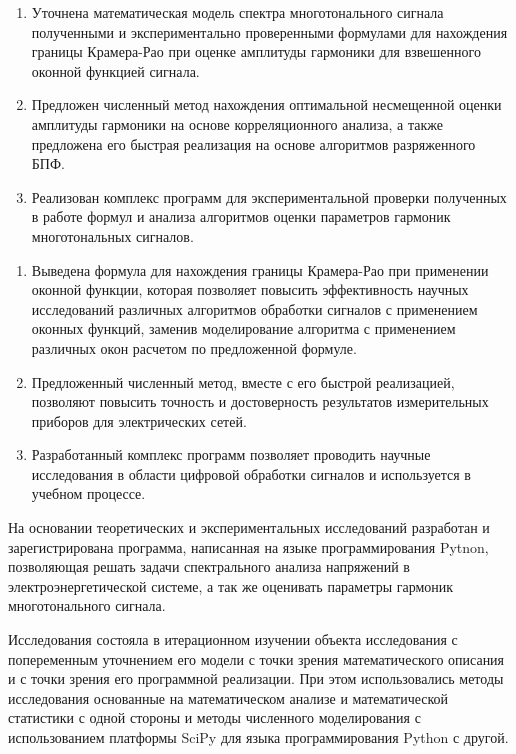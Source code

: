 \begin{enumerate}
  \item Уточнена математическая модель спектра многотонального сигнала полученными и экспериментально проверенными формулами для нахождения границы Крамера-Рао при оценке амплитуды гармоники для взвешенного оконной функцией сигнала.
  
  \item Предложен численный метод нахождения оптимальной несмещенной оценки амплитуды гармоники на основе корреляционного анализа, а также предложена его быстрая реализация на основе алгоритмов разряженного БПФ.
  
  \item Реализован комплекс программ для экспериментальной проверки полученных в работе формул и анализа алгоритмов оценки параметров гармоник многотональных сигналов.
\end{enumerate}

{\influence} 

\begin{enumerate}
	\item Выведена формула для нахождения границы Крамера-Рао при применении оконной функции, которая позволяет повысить эффективность научных исследований различных алгоритмов обработки сигналов с применением оконных функций, заменив моделирование алгоритма с применением различных окон расчетом по предложенной формуле.
	
	\item Предложенный численный метод, вместе с его быстрой реализацией, позволяют повысить точность и достоверность результатов измерительных приборов для электрических сетей.
	
	\item Разработанный комплекс программ позволяет проводить научные исследования в области цифровой обработки сигналов и используется в учебном процессе.
\end{enumerate}

На основании теоретических и экспериментальных исследований разработан и зарегистрирована программа, написанная на языке программирования Pytnon, позволяющая решать задачи спектрального анализа напряжений в электроэнергетической системе, а так же оценивать параметры гармоник многотонального сигнала.


{\methods} 
Исследования состояла в итерационном изучении объекта исследования с попеременным уточнением его модели с точки зрения математического описания и с точки зрения его программной реализации. При этом использовались методы исследования основанные на математическом анализе и математической статистики с одной стороны и методы численного моделирования с использованием платформы SciPy для языка программирования Python с другой.

